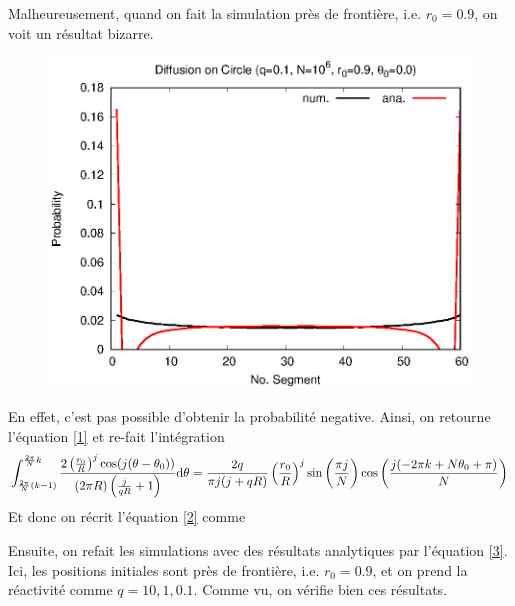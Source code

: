 \documentclass[12pt, oneside]{article}   	%
\begin{document}

Malheureusement, quand on fait la simulation près de frontière, i.e. $r_0 = 0.9$, on voit un résultat bizarre.
\begin{figure}[ht]
\centering
\includegraphics[width=0.9\linewidth]{res/sim-6/pbb_cc.eps}
\end{figure}

En effet, c'est pas possible d'obtenir la probabilité negative. Ainsi, on retourne l'équation \ref{1} et re-fait l'intégration
$$ \int_{\frac{2 \pi}{N} (k-1)}^{\frac{2 \pi}{N}k} \frac{2 \left(\frac{r_0}{R}\right)^j \cos (j (\theta -\theta_0))}{(2 \pi  R) \left(\frac{j}{q R}+1\right)} \mathrm{d}\theta = \frac{2 q}{\pi j (j + q R)} \left(\frac{r_0}{R}\right)^j \sin \left(\frac{\pi  j}{N}\right)  \cos \left(\frac{j (-2 \pi  k+N \theta_0+\pi )}{N}\right) $$
Et donc on récrit l'équation \ref{2} comme


Ensuite, on refait les simulations avec des résultats analytiques par l'équation \ref{3}. Ici, les positions initiales sont près de frontière, i.e. $r_0 = 0.9$, et on prend la réactivité comme $q = 10, 1, 0.1$. Comme vu, on vérifie bien ces résultats.
\end{document}
